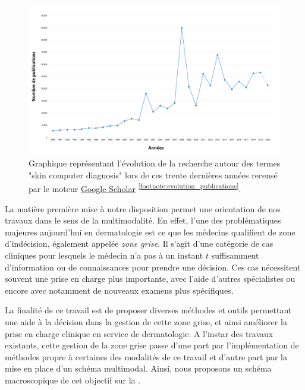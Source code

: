 \begin{figure}[H]
    \centering
    \includegraphics[width=\linewidth]{contents/i_introduction/resources/evolution_publications.pdf}
    \caption{Graphique représentant l'évolution de la recherche autour des termes "skin computer diagnosis" lors de ces trente dernières années recensé par le moteur \href{https://scholar.google.fr/}{Google Scholar} \textsuperscript{\ref{footnote:evolution_publications}}.}
    \label{fig:evolution_publications}
\end{figure}\par
\addtocounter{footnote}{1}

La matière première mise à notre disposition permet une orientation de nos travaux dans le sens de la multimodalité. En effet, l'une des problématiques majeures aujourd'hui en dermatologie est ce que les médecins qualifient de zone d'indécision, également appelée \textit{zone grise}. Il s'agit d'une catégorie de cas cliniques pour lesquels le médecin n'a pas à un instant $t$ suffisamment d'information ou de connaissances pour prendre une décision. Ces cas nécessitent souvent une prise en charge plus importante, avec l'aide d'autres spécialistes ou encore avec notamment de nouveaux examens plus spécifiques.\par

La finalité de ce travail est de proposer diverses méthodes et outils permettant une aide à la décision dans la gestion de cette zone grise, et ainsi améliorer la prise en charge clinique en service de dermatologie. A l'instar des travaux existants, cette gestion de la zone grise passe d'une part par l'implémentation de méthodes propre à certaines des modalités de ce travail et d'autre part par la mise en place d'un schéma multimodal. Ainsi, nous proposons un schéma macroscopique de cet objectif sur la .\par
\clearpage

